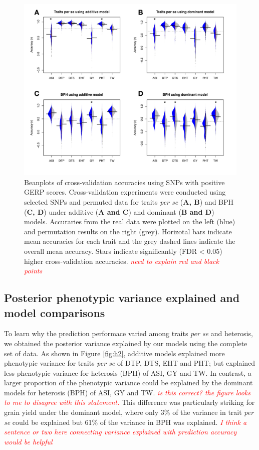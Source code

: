 \documentclass[twoside,twocolumn, letterpaper]{article}
\newcommand{\jri}[1]{\textcolor{red}{ \emph{ #1}} }
\begin{document}
\begin{figure}[htbp]
\centering
\includegraphics[width=\linewidth]{Figure_gerpall_m.pdf}
\caption{Beanplots of cross-validation accuracies using SNPs with positive GERP scores. Cross-validation experiments were conducted using selected SNPs and permuted data for traits \emph{per se} (\textbf{A, B}) and BPH (\textbf{C, D}) under additive (\textbf{A and C}) and dominant (\textbf{B and D}) models. Accuraries from the real data were plotted on the left (blue) and permutation results on the right (grey). Horizotal bars indicate mean accuracies for each trait and the grey dashed lines indicate the overall mean accuracy. Stars indicate significantly (FDR < 0.05) higher cross-validation accuracies.  \jri{need to explain red and black points}}
\label{fig:gerpall}
\end{figure}



\subsection*{Posterior phenotypic variance explained and model comparisons}

To learn why the prediction performace varied among traits \emph{per se} and heterosis, we obtained the posterior variance explained by our models using the complete set of data. 
As shown in Figure \ref{fig:h2}, additive models explained more phenotypic variance for traits \emph{per se} of DTP, DTS, EHT and PHT; but explained less phenotypic variance for heterosis (BPH) of ASI, GY and TW. 
In contrast, a larger proportion of the phenotypic variance could be explained by the dominant models for heterosis (BPH) of ASI, GY and TW. \jri{is this correct? the figure looks to me to disagree with this statement.}
This difference was particularly striking for grain yield under the dominant model, where only 3\% of the variance in trait \emph{per se} could be explained but 61\% of the variance in BPH was explained. \jri{I think a sentence or two here connecting variance explained with prediction accuracy would be helpful}
\end{document}
